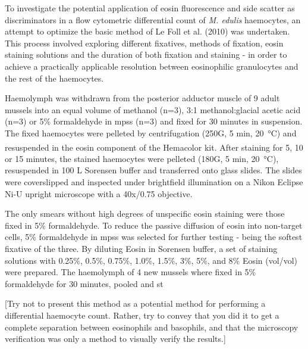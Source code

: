 To investigate the potential application of eosin fluorescence and side scatter as discriminators in a flow cytometric differential count of \emph{M. edulis} haemocytes, an attempt to optimize the basic method of Le Foll et al. (2010) was undertaken. This process involved exploring different fixatives, methods of fixation, eosin staining solutions and the duration of both fixation and staining - in order to achieve a practically applicable resolution between eosinophilic granulocytes and the rest of the haemocytes. 

Haemolymph was withdrawn from the posterior adductor muscle of 9 adult mussels into an equal volume of methanol (n=3), 3:1 methanol:glacial acetic acid (n=3) or 5\% formaldehyde in \acrshort{mpss} (n=3) and fixed for 30 minutes in suspension. The fixed haemocytes were pelleted by centrifugation (250G, 5 min, \SI{20}{\celsius}) and resuspended in the eosin component of the Hemacolor\textsuperscript{\textregistered} kit. After staining for 5, 10 or 15 minutes, the stained haemocytes were pelleted (180G, 5 min, \SI{20}{\celsius}), resuspended in 100 \micro L Sorensen buffer and transferred onto glass slides. The slides were coverslipped and inspected under brightfield illumination on a Nikon Eclipse Ni-U upright microscope with a 40x/0.75 objective.

The only smears without high degrees of unspecific eosin staining were those fixed in 5\% formaldehyde. To reduce the passive diffusion of eosin into non-target cells, 5\% formaldehyde in \acrshort{mpss} was selected for further testing - being the softest fixative of the three. By diluting Eosin in Sorensen buffer, a set of staining solutions with 0.25\%, 0.5\%, 0.75\%, 1.0\%, 1.5\%, 3\%, 5\%, and 8\% Eosin (vol/vol) were prepared. The haemolymph of 4 new mussels where fixed in 5\% formaldehyde for 30 minutes, pooled and st


[Try not to present this method as a potential method for performing a differential haemocyte count. Rather, try to convey that you did it to get a complete separation between eosinophils and basophils, and that the microscopy verification was only a method to visually verify the results.]

